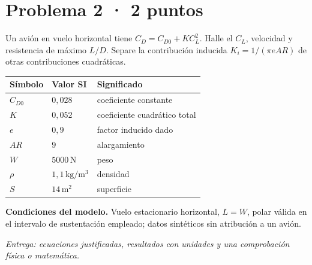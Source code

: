 \par\medskip\noindent\begin{minipage}{\linewidth}

\section{Problema 2 · 2 puntos}

Un avión en vuelo horizontal tiene $C_D=C_{D0}+KC_L^2$. Halle el $C_L$, velocidad y resistencia de máximo $L/D$. Separe la contribución inducida $K_i=1/(\pi eAR)$ de otras contribuciones cuadráticas.

\begin{tabular}{@{}p{.15\linewidth}p{.23\linewidth}p{.54\linewidth}@{}}
\toprule Símbolo & Valor SI & Significado\\\midrule
$C_{D0}$ & $0{,}028$ & coeficiente constante\\
$K$ & $0{,}052$ & coeficiente cuadrático total\\
$e$ & $0{,}9$ & factor inducido dado\\
$AR$ & $9$ & alargamiento\\
$W$ & $5000\,\mathrm{N}$ & peso\\
$\rho$ & $1{,}1\,\mathrm{kg/m^3}$ & densidad\\
$S$ & $14\,\mathrm{m^2}$ & superficie\\
\bottomrule\end{tabular}

\par\medskip\textbf{Condiciones del modelo.} Vuelo estacionario horizontal, $L=W$, polar válida en el intervalo de sustentación empleado; datos sintéticos sin atribución a un avión.

\par\textit{Entrega: ecuaciones justificadas, resultados con unidades y una comprobación física o matemática.}

\end{minipage}\par\medskip

